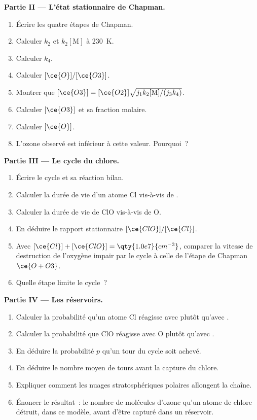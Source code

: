 \begin{problem}
\medskip\noindent\textbf{Partie II --- L'état stationnaire de Chapman.}
\begin{enumerate}[resume]
  \item Écrire les quatre étapes de Chapman.
  \item Calculer $k_2$ et $k_2[\mathrm M]$ à \qty{230}{K}.
  \item Calculer $k_4$.
  \item Calculer $[\ce{O}]/[\ce{O3}]$.
  \item Montrer que $[\ce{O3}] = [\ce{O2}]\sqrt{j_1k_2[\mathrm M]/(j_3k_4)}$.
  \item Calculer $[\ce{O3}]$ et sa fraction molaire.
  \item Calculer $[\ce{O}]$.
  \item L'ozone observé est inférieur à cette valeur. Pourquoi~?
\end{enumerate}

\medskip\noindent\textbf{Partie III --- Le cycle du chlore.}
\begin{enumerate}[resume]
  \item Écrire le cycle et sa réaction bilan.
  \item Calculer la durée de vie d'un atome Cl vis-à-vis de .
  \item Calculer la durée de vie de ClO vis-à-vis de O.
  \item En déduire le rapport stationnaire $[\ce{ClO}]/[\ce{Cl}]$.
  \item Avec $[\ce{Cl}] + [\ce{ClO}] = \qty{1.0e7}{cm^{-3}}$, comparer la
        vitesse de destruction de l'oxygène impair par le cycle à celle de
        l'étape de Chapman $\ce{O + O3}$.
  \item Quelle étape limite le cycle~?
\end{enumerate}

\medskip\noindent\textbf{Partie IV --- Les réservoirs.}
\begin{enumerate}[resume]
  \item Calculer la probabilité qu'un atome Cl réagisse avec 
        plutôt qu'avec
        .
  \item Calculer la probabilité que ClO réagisse avec O plutôt qu'avec
        .
  \item En déduire la probabilité $p$ qu'un tour du cycle soit achevé.
  \item En déduire le nombre moyen de tours avant la capture du chlore.
  \item Expliquer comment les nuages stratosphériques polaires allongent
        la chaîne.
  \item Énoncer le résultat~: le nombre de molécules d'ozone qu'un atome
        de chlore détruit, dans ce modèle, avant d'être capturé dans un
        réservoir.
\end{enumerate}
\end{problem}
